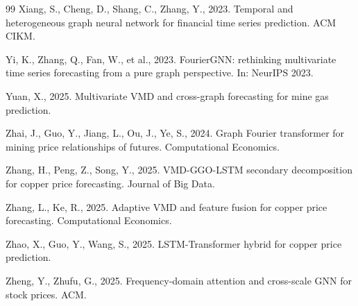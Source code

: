 \documentclass[journal]{IEEEtran}
\begin{document}
\begin{thebibliography}{99}
Xiang, S., Cheng, D., Shang, C., Zhang, Y., 2023. Temporal and heterogeneous graph neural network for financial time series prediction. ACM CIKM.

Yi, K., Zhang, Q., Fan, W., et al., 2023. FourierGNN: rethinking multivariate time series forecasting from a pure graph perspective. In: NeurIPS 2023.

Yuan, X., 2025. Multivariate VMD and cross-graph forecasting for mine gas prediction.

Zhai, J., Guo, Y., Jiang, L., Ou, J., Ye, S., 2024. Graph Fourier transformer for mining price relationships of futures. Computational Economics.

Zhang, H., Peng, Z., Song, Y., 2025. VMD-GGO-LSTM secondary decomposition for copper price forecasting. Journal of Big Data.

Zhang, L., Ke, R., 2025. Adaptive VMD and feature fusion for copper price forecasting. Computational Economics.

Zhao, X., Guo, Y., Wang, S., 2025. LSTM-Transformer hybrid for copper price prediction.

Zheng, Y., Zhufu, G., 2025. Frequency-domain attention and cross-scale GNN for stock prices. ACM.

\end{thebibliography}
\end{document}
